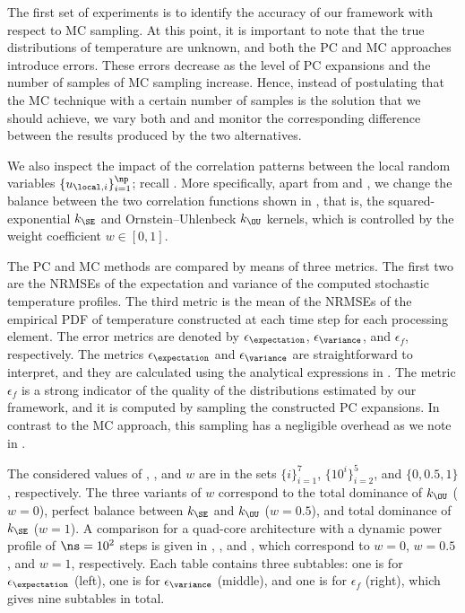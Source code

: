 
The first set of experiments is to identify the accuracy of our framework with
respect to \ac{MC} sampling. At this point, it is important to note that the
true distributions of temperature are unknown, and both the \ac{PC} and \ac{MC}
approaches introduce errors. These errors decrease as the level \lc of \ac{PC}
expansions and the number of samples \no of \ac{MC} sampling increase. Hence,
instead of postulating that the \ac{MC} technique with a certain number of
samples is the solution that we should achieve, we vary both \lc and \no and
monitor the corresponding difference between the results produced by the two
alternatives.

We also inspect the impact of the correlation patterns between the local random
variables $\{ u_{\local, i} \}_{i = 1}^\np$; recall .
More specifically, apart from \lc and \no, we change the balance between the two
correlation functions shown in , that is, the
squared-exponential $k_\SE$ and Ornstein--Uhlenbeck $k_\OU$ kernels, which is
controlled by the weight coefficient $w \in [0, 1]$.

The \ac{PC} and \ac{MC} methods are compared by means of three metrics. The
first two are the \acfp{NRMSE} of the expectation and variance of the computed
stochastic temperature profiles. The third metric is the mean of the \acp{NRMSE}
of the empirical \acf{PDF} of temperature constructed at each time step for each
processing element. The error metrics are denoted by $\epsilon_{\expectation}$,
$\epsilon_{\variance}$, and $\epsilon_f$, respectively. The metrics
$\epsilon_{\expectation}$ and $\epsilon_{\variance}$ are straightforward to
interpret, and they are calculated using the analytical expressions in
. The metric $\epsilon_f$ is a strong indicator of the
quality of the distributions estimated by our framework, and it is computed by
sampling the constructed \ac{PC} expansions. In contrast to the \ac{MC}
approach, this sampling has a negligible overhead as we note in
.

The considered values of \lc, \no, and $w$ are in the sets $\{ i \}_{i = 1}^7$,
$\{ 10^i \}_{i = 2}^5$, and $\{ 0, 0.5, 1 \}$, respectively. The three variants
of $w$ correspond to the total dominance of $k_\OU$ ($w = 0$), perfect balance
between $k_\SE$ and $k_\OU$ ($w = 0.5$), and total dominance of $k_\SE$ ($w =
1$). A comparison for a quad-core architecture with a dynamic power profile of
$\ns = 10^2$ steps is given in ,
, and , which correspond to $w
= 0$, $w = 0.5$, and $w = 1$, respectively. Each table contains three
subtables: one is for $\epsilon_{\expectation}$ (left), one is for
$\epsilon_{\variance}$ (middle), and one is for $\epsilon_f$ (right), which
gives nine subtables in total.

